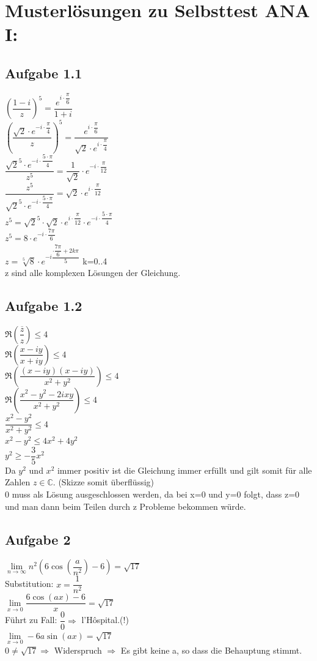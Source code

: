 \documentclass[11pt,final]{scrreprt}
\newcommand{\C} {\mathbb C}
\begin{document}
\newpage
\section*{Musterlösungen zu Selbsttest ANA I: }
\subsection*{Aufgabe 1.1}
$ \left( \dfrac{1-i}{z} \right)^5 = \dfrac{e^{i\cdot\dfrac{\pi}{6}}}{1+i}$\\
$ \left( \dfrac{\sqrt{2}\cdot e^{-i\cdot\dfrac{\pi}{4}}}{z} \right)^5 = \dfrac{e^{i\cdot\dfrac{\pi}{6}}}{\sqrt{2}\cdot e^{i\cdot\dfrac{\pi}{4}}} $\\
$\dfrac{\sqrt{2}^5\cdot e^{-i\cdot\dfrac{5\cdot\pi}{4}}}{z^5} = \dfrac{1}{\sqrt{2}}\cdot{e^{-i\cdot\dfrac{\pi}{12}}} $\\
$\dfrac{z^5}{\sqrt{2}^5\cdot e^{-i\cdot\dfrac{5\cdot\pi}{4}}} = \sqrt{2}\cdot{e^{i\cdot\dfrac{\pi}{12}}} $\\
$z^5= \sqrt{2}^5 \cdot \sqrt{2}\cdot{e^{i\cdot\dfrac{\pi}{12}}}\cdot e^{-i\cdot\dfrac{5\cdot\pi}{4}} $\\
$z^5= 8\cdot{e^{-i\cdot\dfrac{7\pi}{6}}} $\\
$z= \sqrt[5]{8}\cdot{e^{-i\dfrac{\cdot\dfrac{7\pi}{6}+2k\pi}{5}}} $ k=0..4\\
z sind alle komplexen Lösungen der Gleichung.
\subsection*{Aufgabe 1.2}
$ \Re \left( \dfrac{\overline{z}}{z}\right) \leq 4 $\\
$ \Re \left( \dfrac{x-iy}{x+iy}\right) \leq 4 $\\
$ \Re \left( \dfrac{(x-iy)(x-iy)}{x^2+y^2}\right) \leq 4 $\\
$ \Re \left( \dfrac{x^2-y^2-2ixy}{x^2+y^2}\right) \leq 4 $\\
$ \dfrac{x^2-y^2}{x^2+y^2} \leq 4 $\\
$ x^2-y^2 \leq 4x^2+4y^2 $\\
$ y^2\geq -\dfrac{3}{5}x^2 $\\
Da $y^2$ und $x^2$ immer positiv ist die Gleichung immer erfüllt und gilt somit für alle Zahlen $ z\in\C$. (Skizze somit überflüssig)\\
0 muss als Lösung ausgeschlossen werden, da bei x=0 und y=0 folgt, dass z=0 und man dann beim Teilen durch z Probleme bekommen würde.\\
\subsection*{Aufgabe 2}
$ \lim\limits_{n\to\infty} n^2(6\cos(\dfrac{a}{n^2})-6) = \sqrt{17} $\\
Substitution: $x = \dfrac{1}{n^2}$\\
$ \lim\limits_{x\to 0} \dfrac{6\cos(ax)-6}{x} = \sqrt{17} $\\
Führt zu Fall: $\dfrac{0}{0} \Longrightarrow $ l'Hôspital.(!) \\
$ \lim\limits_{x\to 0} -6a\sin(ax) = \sqrt{17} $\\
$ 0 \neq \sqrt{17} \Rightarrow $ Widerspruch $ \Rightarrow $ Es gibt keine a, so dass die Behauptung stimmt.
\end{document}
